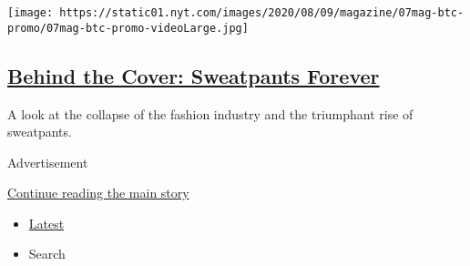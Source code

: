 \begin{enumerate}
  \texttt{[image: https://static01.nyt.com/images/2020/08/09/magazine/07mag-btc-promo/07mag-btc-promo-videoLarge.jpg]}

  \hypertarget{behind-the-cover-sweatpants-forever}{%
  \subsection{\texorpdfstring{\href{/2020/08/07/magazine/behind-the-cover-sweatpants-forever.html}{Behind
  the Cover: Sweatpants
  Forever}}{Behind the Cover: Sweatpants Forever}}\label{behind-the-cover-sweatpants-forever}}

  A look at the collapse of the fashion industry and the triumphant rise
  of sweatpants.
\end{enumerate}

Advertisement

\protect\hyperlink{after-mid1}{Continue reading the main story}

\begin{itemize}
\tightlist
\item
  \protect\hyperlink{stream-panel}{Latest}
\item
  Search
\end{itemize}

